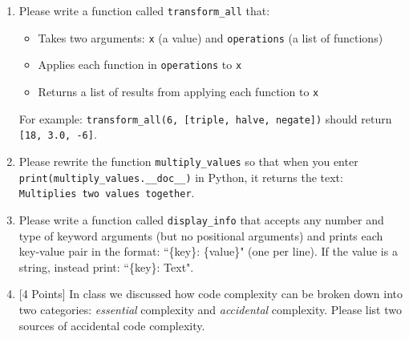 \documentclass[11pt]{article}
\begin{document}
\vspace{1cm}

\begin{enumerate}
    \item Please write a function called \texttt{transform\_all} that:
    \begin{itemize}
        \item Takes two arguments: \texttt{x} (a value) and \texttt{operations} (a list of functions)
        \item Applies each function in \texttt{operations} to \texttt{x}
        \item Returns a list of results from applying each function to \texttt{x}
    \end{itemize}
    
    For example: \texttt{transform\_all(6, [triple, halve, negate])} should return \texttt{[18, 3.0, -6]}.
    
\vspace{5.5cm}
    
    \item Please rewrite the function \texttt{multiply\_values} so that when you enter \texttt{print(multiply\_values.\_\_doc\_\_)} in Python, it returns the text: \texttt{Multiplies two values together}. 
    
\vspace{4cm}

    \item Please write a function called \texttt{display\_info} that accepts any number and type of keyword arguments (but no positional arguments) and prints each key-value pair in the format: ``\{key\}: \{value\}" (one per line). If the value is a string, instead print: ``\{key\}: Text".
    
\vspace{5.5cm}
\item {[4 Points]} In class we discussed how code complexity can be broken down into two categories: {\it essential} complexity and {\it accidental} complexity. Please list two sources of accidental code complexity.
    
\end{enumerate}
\end{document}
